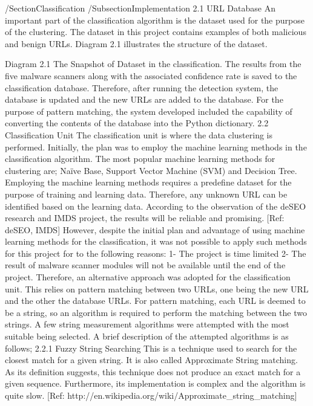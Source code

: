 /Section{Classification}
/Subsection{Implementation}
2.1 URL Database
An important part of the classification algorithm is the dataset used for the purpose of the clustering. The dataset in this project contains examples of both malicious and benign URLs. Diagram 2.1 illustrates the structure of the dataset.  

Diagram 2.1 The Snapshot of Dataset in the classification.
The results from the five malware scanners along with the associated confidence rate is saved to the classification database. Therefore, after running the detection system, the database is updated and the new URLs are added to the database. For the purpose of pattern matching, the system developed included the capability of converting the contents of the database into the Python dictionary.
2.2 Classification Unit
The classification unit is where the data clustering is performed. Initially, the plan was to employ the machine learning methods in the classification algorithm. The most popular machine learning methods for clustering are; Naïve Base, Support Vector Machine (SVM) and Decision Tree. Employing the machine learning methods requires a predefine dataset for the purpose of training and learning data. Therefore, any unknown URL can be identified based on the learning data. According to the observation of the deSEO research and IMDS project, the results will be reliable and promising. [Ref: deSEO, IMDS]
However, despite the initial plan and advantage of using machine learning methods for the classification, it was not possible to apply such methods for this project for to the following reasons:
1-	The project is time limited  
2-	The result of malware scanner modules will not be available until the end of the project.
Therefore, an alternative approach was adopted for the classification unit. This relies on pattern matching between two URLs, one being the new URL and the other the database URLs. For pattern matching, each URL is deemed to be a string, so an algorithm is required to perform the matching between the two strings. A few string measurement algorithms were attempted with the most suitable being selected. A brief description of the attempted algorithms is as follows;
			2.2.1 Fuzzy String Searching
This is a technique used to search for the closest match for a given string. It is also called Approximate String matching. As its definition suggests, this technique does not produce an exact match for a given sequence. Furthermore, its implementation is complex and the algorithm is quite slow.
[Ref: http://en.wikipedia.org/wiki/Approximate_string_matching]
